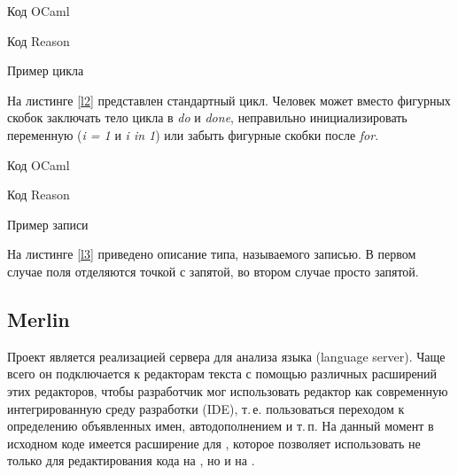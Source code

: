 \hfill


\begin{example}
	\begin{subexample}{0.5\textwidth}
		
		\caption{Код OCaml}
	\end{subexample}
	\begin{subexample}{0.5\textwidth}
		
		\caption{Код Reason}
	\end{subexample}
\caption{Пример цикла}\label{l2}
\end{example}

На листинге \ref{l2} представлен стандартный цикл. Человек может вместо фигурных скобок заключать тело цикла в {\it do} и {\it done}, неправильно инициализировать переменную ({\it i = 1} и {\it i in 1}) или забыть фигурные скобки после {\it for}.


\hfill


\begin{example}
	\begin{subexample}{0.5\textwidth}
		
		\caption{Код OCaml}
	\end{subexample}
	\begin{subexample}{0.5\textwidth}
		
		\caption{Код Reason}
	\end{subexample}
\caption{Пример записи}\label{l3}
\end{example}

На листинге \ref{l3} приведено описание типа, называемого записью. В первом случае поля отделяются точкой с запятой, во втором случае просто запятой.

\subsection{Merlin}

Проект \merlin{}\cite{mer} является реализацией сервера для анализа языка \OCaml{} (language server). Чаще всего он подключается к редакторам текста с помощью различных расширений этих редакторов, чтобы разработчик мог использовать редактор как современную интегрированную среду разработки (IDE), т.\,е. пользоваться переходом к определению объявленных имен, автодополнением и т.\,п. На данный момент в исходном коде \ReasonML{} имеется расширение для \merlin{}, которое позволяет использовать \merlin{} не только для редактирования кода на \OCaml{}, но и на \ReasonML{}.

